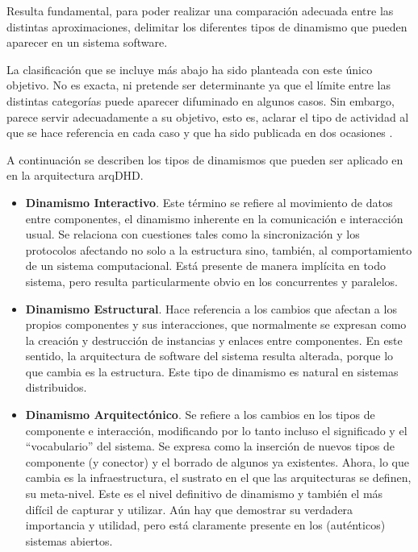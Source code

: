 Resulta fundamental, para poder realizar una comparación adecuada entre las
distintas aproximaciones, delimitar los diferentes tipos de dinamismo que
pueden aparecer en un sistema software.

La clasificación que se incluye más abajo ha sido planteada con este único
objetivo. No es exacta, ni pretende ser determinante ya que el límite entre las
distintas categorías puede aparecer difuminado en algunos casos. Sin
embargo, parece servir adecuadamente a su objetivo, esto es,
aclarar el tipo de actividad al que se hace referencia en cada caso y que ha
sido publicada en dos ocasiones \cite{CFBSB00, CFBSB01}. 

A continuación se describen los tipos de dinamismos que pueden ser aplicado en en la arquitectura arqDHD. 

\begin{itemize}
\item 
\textbf{Dinamismo Interactivo}. Este término se refiere al movimiento de datos
entre componentes, el dinamismo inherente en la comunicación e interacción
usual. Se relaciona con cuestiones tales como la sincronización y los
protocolos afectando no solo a la estructura sino, también, al comportamiento de un sistema
computacional. Está presente de manera implícita en todo sistema, pero resulta
particularmente obvio en los concurrentes y paralelos.

\item
\textbf{Dinamismo Estructural}. Hace referencia a los cambios que afectan a los propios
componentes y sus interacciones, que normalmente se expresan como la creación
y destrucción de instancias y enlaces entre componentes. En este sentido, la
arquitectura de software del sistema resulta alterada, porque lo que cambia es
la estructura. Este tipo de dinamismo es natural en sistemas distribuidos.

\item 
\textbf{Dinamismo Arquitectónico}. Se refiere a los cambios en los tipos de
componente e interacción, modificando por lo tanto incluso el significado y el 
“vocabulario” del sistema. Se expresa como la inserción de nuevos tipos de
componente (y conector) y el borrado de algunos ya existentes. Ahora, lo que
cambia es la infraestructura, el sustrato en el que las arquitecturas se
definen, su meta-nivel. Este es el nivel definitivo de dinamismo y también el
más difícil de capturar y utilizar. Aún hay que demostrar su verdadera
importancia y utilidad, pero está claramente presente en los (auténticos)
sistemas abiertos.

\end{itemize}
